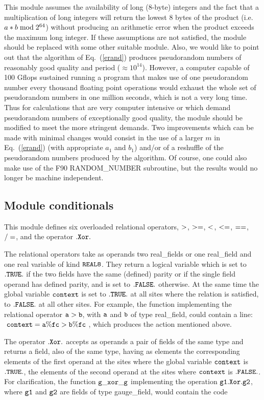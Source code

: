 This module assumes the availability of long (8-byte) integers and the fact
that a multiplication of long integers will return the lowest 8 bytes of the
product (i.e. $a*b\; {\rm mod}\; 2^{64}$) without producing an arithmetic error
when the product exceeds the maximum long integer.  If these assumptions
are not satisfied, the module should be replaced with some other suitable
module.  Also, we would like to point out that the algorithm of 
Eq.~(\ref{erand}) produces pseudorandom numbers of reasonably good quality
and period ($ \approx 10^{14}$).  However, a computer capable of
100 Gflops sustained running a program that makes use of one pseudorandom
number every thousand floating point operations would exhaust the
whole set of pseudorandom numbers in one million seconds, which is not
a very long time.  Thus for calculations that are very computer intensive
or which demand pseudorandom numbers of exceptionally good
quality, the module should be modified to meet the more
stringent demands.  Two improvements which can be made with 
minimal changes would consist in the use of a larger $m$ 
in Eq.~(\ref{erand}) (with appropriate $a_1$ and $b_1$) and/or of
a reshuffle of the pseudorandom numbers produced by the algorithm.
Of course, one could also make use of the F90 RANDOM\_NUMBER
subroutine, but the results would no longer be machine independent.

\subsection{Module conditionals}
\label{conditionals}

This module defines six overloaded relational operators, $\tt >$, $\tt >=$,
$\tt < $, $\tt <= $, $\tt == $, $\tt /=$, and the operator $\tt .Xor.$

The relational operators take as operands two real\_fields or one 
real\_field and one real variable of kind $\tt REAL8$.
They return a logical variable which is set to $\tt .TRUE.$ if 
the two fields have the same (defined) parity or if the single
field operand has defined parity, and is set to $\tt .FALSE.$ otherwise.  
At the same time the global variable $\tt context$ 
is set to $\tt .TRUE.$ at all sites where the relation is satisfied, 
to $\tt .FALSE.$ at all other sites.  For example, the function
implementing the relational operator $\tt a>b$, with
$\tt a$ and $\tt b$ of type real\_field, could contain a line:
$\tt\; context=a\%fc>b\%fc \;$, which produces the action mentioned above.

The operator $\tt .Xor.$ accepts as operands a pair of fields
of the same type and returns a field, also of the same type,
having as elements the corresponding elements of the first operand 
at the sites where the global variable $\tt context$ is $\tt .TRUE.$, 
the elements of the second operand at the sites where $\tt context$
is $\tt .FALSE.$.  For clarification, the function $\tt g\_xor\_g$ 
implementing the operation $\tt g1 .Xor. g2$, where $\tt g1$
and $\tt g2$ are fields of type gauge\_field,  would contain
the code

